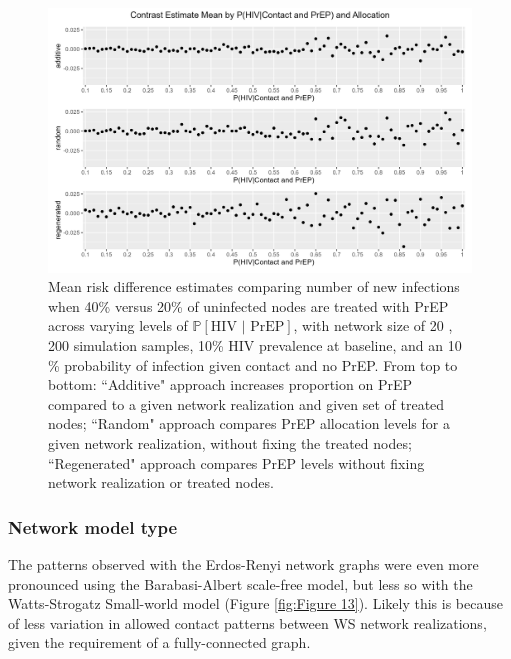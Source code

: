 \documentclass{article}
\theoremstyle{definition}
\begin{document}
\begin{figure}[H]
    \centering
    \includegraphics[width=\linewidth]{Figures/p2 Mean plots.png}
    \caption{
    Mean risk difference estimates comparing number of new infections when 40\% versus 20\% of uninfected nodes are treated with PrEP across varying levels of  $\mathbb{P}\left[\text{HIV } \vert \text{ PrEP}\right]$, with network size of 20 ,  200 simulation samples,  10\% HIV prevalence at baseline, and an 10 \% probability of infection given contact and no PrEP.
     From top to bottom: ``Additive" approach increases proportion on PrEP compared to a given network realization and given set of treated nodes; ``Random" approach compares PrEP allocation levels for a given network realization, without fixing the treated nodes; ``Regenerated" approach compares PrEP levels without fixing network realization or treated nodes.}
    \label{fig:Figure 12}

\end{figure}


\subsubsection{Network model type}
The patterns observed with the Erdos-Renyi network graphs were even more pronounced using the Barabasi-Albert scale-free model,  but less so with the Watts-Strogatz Small-world model (Figure \ref{fig:Figure 13}). Likely this is because of less variation in allowed contact patterns between WS network realizations, given the requirement of a fully-connected graph. 
\end{document}
